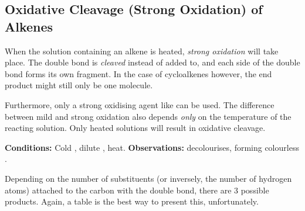 

	\pagebreak
	\hypertarget{OxidativeCleavageOfAlkenes}{}
	\subsection{Oxidative Cleavage (Strong Oxidation) of Alkenes}

		When the  solution containing an alkene is heated, \textit{strong oxidation} will take place. The double bond is
		\textit{cleaved} instead of added to, and each side of the double bond forms its own fragment. In the case of cycloalkenes
		however, the end product might still only be one molecule.

		Furthermore, only a strong oxidising agent like  can be used. The difference between mild and strong oxidation also
		depends \textit{only} on the temperature of the reacting solution. Only heated solutions will result in oxidative cleavage.

		\vspace{1.5em}
		\vbox{\textbf{Conditions:}	\tabto{35mm}Cold , dilute , heat.}	%
		\vbox{\textbf{Observations:}  decolourises, forming colourless .}

		\vspace{1.0em}

		Depending on the number of substituents (or inversely, the number of hydrogen atoms) attached to the carbon with the double bond,
		there are 3 possible products. Again, a table is the best way to present this, unfortunately.

